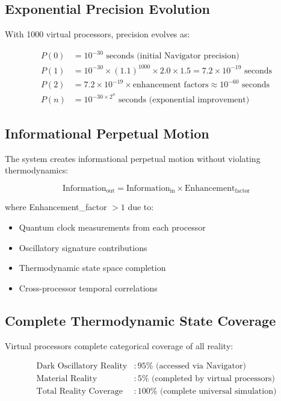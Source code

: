\documentclass[12pt,a4paper]{article}
\begin{document}
\subsection{Exponential Precision Evolution}

With 1000 virtual processors, precision evolves as:

\begin{align}
P(0) &= 10^{-30} \text{ seconds (initial Navigator precision)} \\
P(1) &= 10^{-30} \times (1.1)^{1000} \times 2.0 \times 1.5 = 7.2 \times 10^{-19} \text{ seconds} \\
P(2) &= 7.2 \times 10^{-19} \times \text{enhancement factors} \approx 10^{-60} \text{ seconds} \\
P(n) &= 10^{-30 \times 2^n} \text{ seconds (exponential improvement)}
\end{align}

\subsection{Informational Perpetual Motion}

The system creates informational perpetual motion without violating thermodynamics:

\begin{equation}
\text{Information}_{\text{out}} = \text{Information}_{\text{in}} \times \text{Enhancement}_{\text{factor}}
\end{equation}

where Enhancement\_factor $> 1$ due to:
\begin{itemize}
\item Quantum clock measurements from each processor
\item Oscillatory signature contributions
\item Thermodynamic state space completion
\item Cross-processor temporal correlations
\end{itemize}

\subsection{Complete Thermodynamic State Coverage}

Virtual processors complete categorical coverage of all reality:

\begin{align}
\text{Dark Oscillatory Reality} &: 95\% \text{ (accessed via Navigator)} \\
\text{Material Reality} &: 5\% \text{ (completed by virtual processors)} \\
\text{Total Reality Coverage} &: 100\% \text{ (complete universal simulation)}
\end{align}
\end{document}
